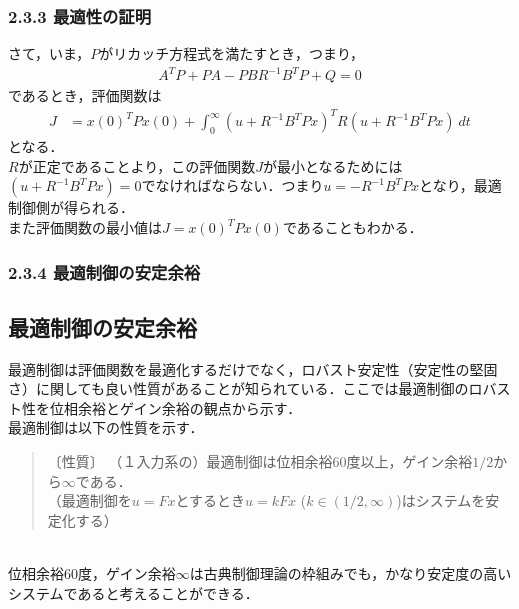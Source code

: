 \begin{frame}[t]
\frametitle{2.3.3 最適性の証明}
さて，いま，$P$がリカッチ方程式を満たすとき，つまり，
\begin{align}
	A^T P + PA - P B R^{-1} B^T P + Q =0
\nonumber 
\end{align}
であるとき，評価関数は
\begin{align}
	J &= x(0)^T P x(0)
	+ \int_{0}^{\infty} (u + R^{-1}B^T Px)^T R (u + R^{-1}B^T Px) \ dt
\end{align}
となる．
\\[3mm]

$R$が正定であることより，この評価関数$J$が最小となるためには$(u + R^{-1}B^T Px)=0$でなければならない．つまり$u = -R^{-1}B^T P x$となり，最適制御側が得られる．
\\[3mm]

また評価関数の最小値は$J=x(0)^T P x(0)$であることもわかる．
\end{frame}

\begin{frame}[t]
\frametitle{2.3.4 最適制御の安定余裕}

\subsection{最適制御の安定余裕}

最適制御は評価関数を最適化するだけでなく，ロバスト安定性（安定性の堅固さ）に関しても良い性質があることが知られている．ここでは最適制御のロバスト性を位相余裕とゲイン余裕の観点から示す．
\\[3mm]

最適制御は以下の性質を示す．
\\[3mm]

\begin{quote}
〔性質〕 （１入力系の）最適制御は位相余裕60度以上，ゲイン余裕$1/2$から$\infty$である．\\
（最適制御を$u=Fx$とするとき$u=kFx$ ($k \in (1/2,\infty)$)はシステムを安定化する）
\end{quote}
\ \\

位相余裕60度，ゲイン余裕$\infty$は古典制御理論の枠組みでも，かなり安定度の高いシステムであると考えることができる．

\end{frame}

